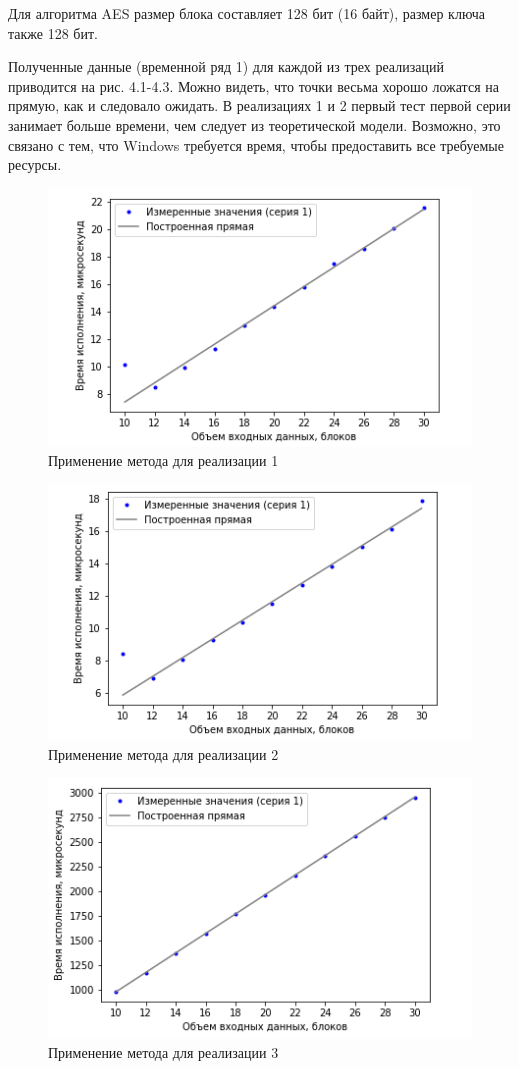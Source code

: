 Для алгоритма AES размер блока составляет 128 бит (16 байт), размер ключа также 128 бит.

Полученные данные (временной ряд 1) для каждой из трех реализаций приводится на рис. 4.1-4.3. Можно видеть, что точки весьма хорошо ложатся на прямую, как и следовало ожидать. В реализациях 1 и 2 первый тест первой серии занимает больше времени, чем следует из теоретической модели. Возможно, это связано с тем, что Windows требуется время, чтобы предоставить все требуемые ресурсы.

\begin{figure}[ht!] 
	\includegraphics [scale=0.8] {my_folder/plots//plot1}
	\centering
	\caption{Применение метода для реализации 1} 
\end{figure}

\begin{figure}[ht!] 
	\includegraphics [scale=0.7] {my_folder/plots//plot2}
	\centering
	\caption{Применение метода для реализации 2} 
\end{figure}

\begin{figure}[ht!] 
	\includegraphics [scale=0.7] {my_folder/plots//plot3}
	\centering
	\caption{Применение метода для реализации 3} 
\end{figure}

